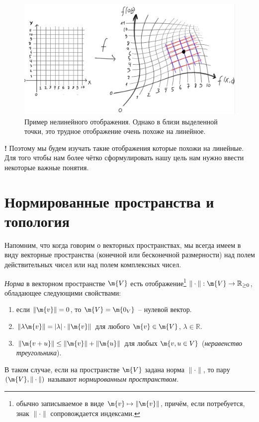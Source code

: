 \begin{figure}[h!]
    \centering
    \includegraphics[scale = 0.7]{images/deff+linear.jpg}
    \caption{Пример нелинейного отображения. Однако в близи выделенной точки, это трудное отображение очень похоже на линейное.}
    \label{deff+linear}
\end{figure}


\begin{mydangerr}{\bf !}
 Поэтому мы будем изучать такие отображения которые похожи на линейные. Для того чтобы нам более чётко сформулировать нашу цель нам нужно ввести некоторые важные понятия.    
\end{mydangerr}



\section{Нормированные пространства и топология}

Напомним, что когда говорим о векторных пространствах, мы всегда имеем в виду векторные пространства (конечной или бесконечной размерности) над полем действительных чисел или над полем комплексных чисел. 

\begin{definition}
    \textit{Норма} в векторном пространстве $\m{V}$ есть отображение\footnote{обычно записываемое в виде $\m{v} \mapsto \| \m{v}\|$, причём, если потребуется, знак $ \| \cdot \|$ сопровождается индексами.} $\|\cdot\|: \m{V} \to \mathbb{R}_{\ge 0}$, обладающее следующими свойствами:
    \begin{enumerate}
        \item если $\| \m{v}\| = 0$, то $\m{V} = \m{0_V}$ -- нулевой вектор.
        \item $\|\lambda \m{v} \| = |\lambda| \cdot \| \m{v}\|$ для любого $\m{v} \in \m{V}$, $\lambda \in \mathbb{R}$.
        \item $\| \m{v+u} \| \le \|\m{v}\| + \|\m{u}\|$ для любых $\m{v,u \in V}$ (\textit{неравенство треугольника}).
    \end{enumerate}
В таком случае, если на пространстве $\m{V}$ задана норма $\|\cdot\|$, то пару $(\m{V}, \|\cdot\|)$ называют \textit{нормированным пространством.}
\end{definition}


